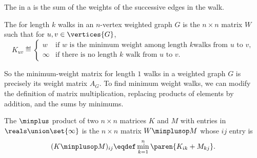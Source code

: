 \begin{definition}\label{def:5H}
  The   in a  is the sum of the weights of
  the successive edges in the walk.
\end{definition}

\iffalse
There is good news and bad news to report on this front.  The good
news is that it is not very hard to find a shortest path.  The bad
news is that you can't win one of those million dollar prizes for
doing it.

In fact, there are several good algorithms known for finding a
shortest path between nodes $u$ and $v$ in an $n$-node graph $G$.  The
simplest to explain (but not quite the fastest) is to compute the
successive powers of $A_G$ one by one up to the $n$th, watching for
the first power at which the $uv$th entry is nonzero.  That's because
Theorem~\ref{thm:CkDm} implies that the length of the shortest path,
if any, between $u$ and~$v$ will be the smallest value~$k$ for which
$(A_G)_{uv}^k$ is nonzero, and if there is a shortest path, its length
will be $\leq n$.
\fi

\begin{definition}
  The  for length $k$ walks in an $n$-vertex
  weighted graph $G$ is the $n \times n$ matrix $W$ such that for $u,v \in \vertices{G}$,
\begin{equation}\label{def:weight_matrix}
K_{uv} \eqdef
\begin{cases} w & \text{if $w$ is the minimum weight among length $k$
                            walks from $u$ to $v$},\\
              \infty & \text{if there is no length $k$ walk from $u$ to $v$}.
\end{cases}
\end{equation}
\end{definition}

So the minimum-weight matrix for length $1$ walks in a weighted graph
$G$ is precisely its weight matrix $A_G$.  To find minimum weight
walks, we can modify the definition of matrix multiplication,
replacing products of elements by addition, and the sums by minimums.
\begin{definition}\label{def:minplus}
  The $\minplus$ product of two $n\times n$ matrices $K$ and $M$ with
  entries in $\reals\union \set{\infty}$ is the $n \times n$ matrix
  $W\minplusop M$ whose $ij$ entry is
\[
(K\minplusop M )_{ij} \eqdef \min_{k=1}^n \paren{K_{ik} + M_{kj}}.
\]
\end{definition}


